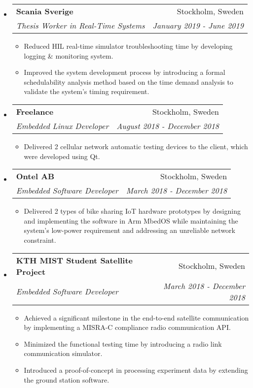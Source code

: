 \documentclass[letterpaper,9pt]{article}
\makeatletter
\newcommand{\resitem}[1]{\item #1 \vspace{-2pt}}
\newcommand{\ressubheading}[4]{
\begin{tabular*}{7.0in}{l@{\cftdotfill{\cftsecdotsep}\extracolsep{\fill}}r}
		\textbf{#1} & #2 \\
        \textit{#3} & \textit{#4} \\
\end{tabular*}\vspace{-6.3pt}}
\makeatother
\begin{document}
\begin{itemize}

  \item
        \ressubheading{Scania Sverige}{Stockholm, Sweden}{Thesis Worker in Real-Time Systems}{January 2019 - June 2019}
        \begin{itemize}
          \resitem{Reduced HIL real-time simulator troubleshooting time by developing logging \& monitoring system.}
          \resitem{Improved the system development process by introducing a formal schedulability analysis method based on the time demand analysis to validate the system's timing requirement.}
        \end{itemize}

  \item
        \ressubheading{Freelance}{Stockholm, Sweden}{Embedded Linux Developer}{August 2018 - December 2018}
        \begin{itemize}
          \resitem{Delivered 2 cellular network automatic testing devices to the client, which were developed using Qt.}
        \end{itemize}

  \item
        \ressubheading{Ontel AB}{Stockholm, Sweden}{Embedded Software Developer}{March 2018 - December 2018}
        \begin{itemize}
          \resitem{Delivered 2 types of bike sharing IoT hardware prototypes by designing and implementing the software in Arm MbedOS while maintaining the system's low-power requirement and addressing an unreliable network constraint.}
        \end{itemize}

  \item
        \ressubheading{KTH MIST Student Satellite Project}{Stockholm, Sweden}{Embedded Software Developer}{March 2018 - December 2018}
        \begin{itemize}
          \resitem{Achieved a significant milestone in the end-to-end satellite communication by implementing a MISRA-C compliance radio communication API.}
          \resitem{Minimized the functional testing time by introducing a radio link communication simulator.}
          \resitem{Introduced a proof-of-concept in processing experiment data by extending the ground station software.}
        \end{itemize}


\end{itemize}
\end{document}
